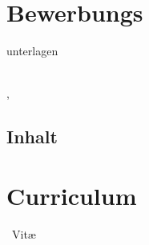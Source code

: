 \documentclass[11pt,a4paper,roman]{moderncv}
\begin{document}


\makeatletter
{}
\pagestyle{empty}

\chapter*{Bewerbungs}{unterlagen}

\vspace*{50mm}
\begin{minipage}{\textwidth}
	\vspace*{3mm}
	\familynamestyle{\@firstname}~~\firstnamestyle{\@familyname} 	
	\\[3mm]
	\@addressstreet, \@addresscity ~~~ \mobilesymbol~\@mobile ~~~ \emailsymbol~\@email
\end{minipage}
\begin{minipage}{70pt}
	
\end{minipage}

\vfill

\begin{minipage}{1.0\textwidth}
	\section{Inhalt}
	\tableofcontents
\end{minipage}

\newpage
\pagestyle{fancy}
\chapter{Curriculum}{~Vit\ae}
\makequote
\end{document}
